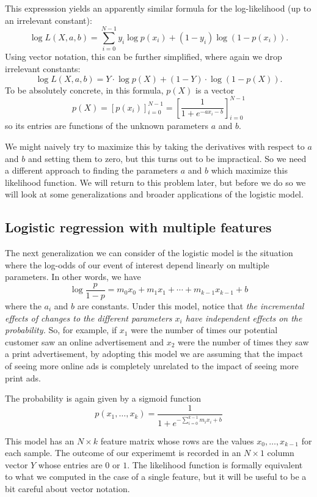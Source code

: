 \documentclass[
  11pt,
  letterpaper,
]{scrbook}
\theoremstyle{plain}
\theoremstyle{plain}
\theoremstyle{remark}
\begin{document}
This expresssion yields an apparently similar formula for the
log-likelihood (up to an irrelevant constant): \[
\log L(X,a,b) = \sum_{i=0}^{N-1} y_i\log p(x_i) + (1-y_i)\log (1-p(x_i)).
\] Using vector notation, this can be further simplified, where again we
drop irrelevant constants: \[
\log L(X,a,b) = Y\cdot\log p(X) + (1-Y)\cdot \log(1-p(X)).
\] To be absolutely concrete, in this formula, \(p(X)\) is a vector \[
p(X)=[p(x_i)]_{i=0}^{N-1} = \left[\frac{1}{1+e^{-ax_i-b}} \right]_{i=0}^{N-1}
\] so its entries are functions of the unknown parameters \(a\) and
\(b\).

We might naively try to maximize this by taking the derivatives with
respect to \(a\) and \(b\) and setting them to zero, but this turns out
to be impractical. So we need a different approach to finding the
parameters \(a\) and \(b\) which maximize this likelihood function. We
will return to this problem later, but before we do so we will look at
some generalizations and broader applications of the logistic model.

\hypertarget{logistic-regression-with-multiple-features}{%
\subsection{Logistic regression with multiple
features}\label{logistic-regression-with-multiple-features}}

The next generalization we can consider of the logistic model is the
situation where the log-odds of our event of interest depend linearly on
multiple parameters. In other words, we have \[
\log\frac{p}{1-p} = m_0 x_0 + m_1 x _1 + \cdots + m_{k-1} x_{k-1} + b 
\] where the \(a_i\) and \(b\) are constants. Under this model, notice
that \emph{the incremental effects of changes to the different
parameters \(x_i\) have independent effects on the probability.} So, for
example, if \(x_1\) were the number of times our potential customer saw
an online advertisement and \(x_2\) were the number of times they saw a
print advertisement, by adopting this model we are assuming that the
impact of seeing more online ads is completely unrelated to the impact
of seeing more print ads.

The probability is again given by a sigmoid function \[
p(x_1,\ldots, x_k) = \frac{1}{1+e^{-\sum_{i=0}^{k-1} m_i x_i +b}}
\]

This model has an \(N\times k\) feature matrix whose rows are the values
\(x_0,\ldots, x_{k-1}\) for each sample. The outcome of our experimemt
is recorded in an \(N\times 1\) column vector \(Y\) whose entries are
\(0\) or \(1\). The likelihood function is formally equivalent to what
we computed in the case of a single feature, but it will be useful to be
a bit careful about vector notation.
\end{document}
